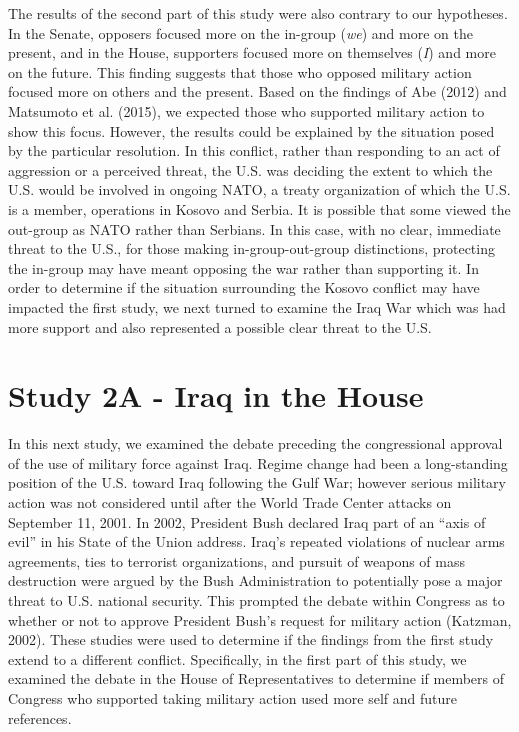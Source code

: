 \documentclass[english,,man]{apa6}
\theoremstyle{definition}
\theoremstyle{definition}
\theoremstyle{definition}
\theoremstyle{remark}
\begin{document}
The results of the second part of this study were also contrary to our
hypotheses. In the Senate, opposers focused more on the in-group
(\emph{we}) and more on the present, and in the House, supporters
focused more on themselves (\emph{I}) and more on the future. This
finding suggests that those who opposed military action focused more on
others and the present. Based on the findings of Abe (2012) and
Matsumoto et al. (2015), we expected those who supported military action
to show this focus. However, the results could be explained by the
situation posed by the particular resolution. In this conflict, rather
than responding to an act of aggression or a perceived threat, the U.S.
was deciding the extent to which the U.S. would be involved in ongoing
NATO, a treaty organization of which the U.S. is a member, operations in
Kosovo and Serbia. It is possible that some viewed the out-group as NATO
rather than Serbians. In this case, with no clear, immediate threat to
the U.S., for those making in-group-out-group distinctions, protecting
the in-group may have meant opposing the war rather than supporting it.
In order to determine if the situation surrounding the Kosovo conflict
may have impacted the first study, we next turned to examine the Iraq
War which was had more support and also represented a possible clear
threat to the U.S.

\hypertarget{study-2a---iraq-in-the-house}{%
\section{Study 2A - Iraq in the
House}\label{study-2a---iraq-in-the-house}}

In this next study, we examined the debate preceding the congressional
approval of the use of military force against Iraq. Regime change had
been a long-standing position of the U.S. toward Iraq following the Gulf
War; however serious military action was not considered until after the
World Trade Center attacks on September 11, 2001. In 2002, President
Bush declared Iraq part of an \enquote{axis of evil} in his State of the
Union address. Iraq's repeated violations of nuclear arms agreements,
ties to terrorist organizations, and pursuit of weapons of mass
destruction were argued by the Bush Administration to potentially pose a
major threat to U.S. national security. This prompted the debate within
Congress as to whether or not to approve President Bush's request for
military action (Katzman, 2002). These studies were used to determine if
the findings from the first study extend to a different conflict.
Specifically, in the first part of this study, we examined the debate in
the House of Representatives to determine if members of Congress who
supported taking military action used more self and future references.
\end{document}

